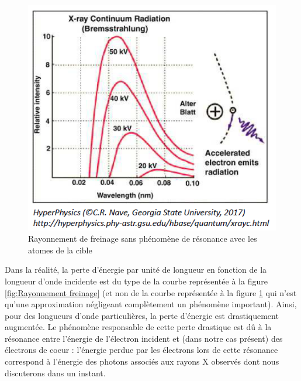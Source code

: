 \begin{figure}[tph]
    \centering
    \includegraphics[scale=1.0]{Images2/FreinageIdéalisé.PNG}
    \caption{Rayonnement de freinage sans phénomène de résonance avec les atomes de la cible}
    \label{fig:Freinage idéalisé}
\end{figure}
Dans la réalité, la perte d'énergie par unité de longueur en fonction de la longueur d'onde incidente est du type de la courbe représentée à la figure \ref{fig:Rayonnement freinage} (et non de la courbe représentée à la figure \ref{fig:Freinage idéalisé} qui n'est qu'une approximation négligeant complètement un phénomène important). Ainsi, pour des longueurs d'onde particulières, la perte d'énergie est drastiquement augmentée. Le phénomène responsable de cette perte drastique est dû à la résonance entre l'énergie de l'électron incident et (dans notre cas présent) des électrons de coeur : l'énergie perdue par les électrons lors de cette résonance correspond à l'énergie des photons associés aux rayons X observés dont nous discuterons dans un instant.\\

